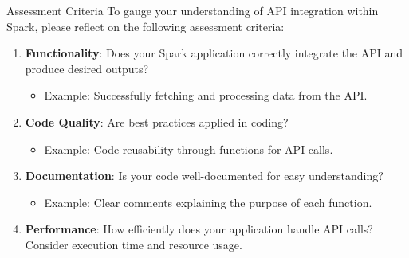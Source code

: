 \documentclass[aspectratio=169]{beamer}
\begin{document}
\begin{frame}[fragile]{Assessment Criteria}
    To gauge your understanding of API integration within Spark, please reflect on the following assessment criteria:

    \begin{enumerate}
        \item \textbf{Functionality}: Does your Spark application correctly integrate the API and produce desired outputs?
        \begin{itemize}
            \item Example: Successfully fetching and processing data from the API.
        \end{itemize}
        
        \item \textbf{Code Quality}: Are best practices applied in coding? 
        \begin{itemize}
            \item Example: Code reusability through functions for API calls.
        \end{itemize}

        \item \textbf{Documentation}: Is your code well-documented for easy understanding? 
        \begin{itemize}
            \item Example: Clear comments explaining the purpose of each function.
        \end{itemize}

        \item \textbf{Performance}: How efficiently does your application handle API calls? Consider execution time and resource usage.
    \end{enumerate}
\end{frame}
\end{document}
